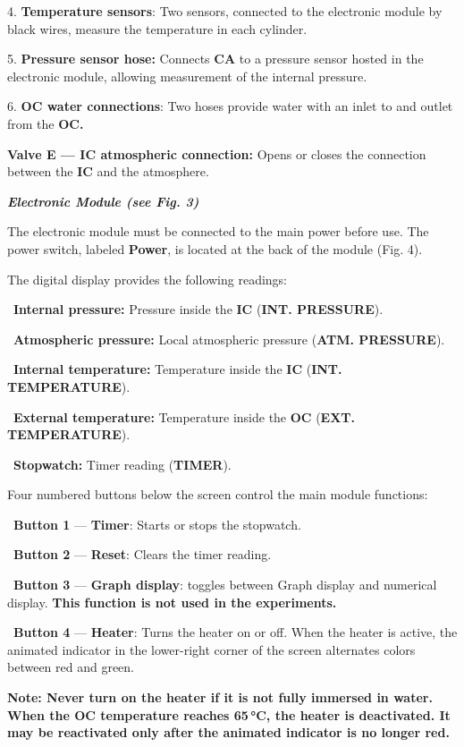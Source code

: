 4. \textbf{Temperature sensors}: Two sensors, connected to the electronic
module by black wires, measure the temperature in each cylinder.

5. \textbf{Pressure sensor hose:} Connects \textbf{CA} to a pressure sensor
hosted in the electronic module, allowing measurement of the internal
pressure.

6. \textbf{OC water connections}: Two hoses provide water with an inlet to and
outlet from the \textbf{OC.}

\textbf{Valve E — IC atmospheric connection:} Opens or closes the connection
between the \textbf{IC} and the atmosphere.

\textbf{\textit{Electronic Module (see Fig. 3)}}

The electronic module must be connected to the main power before use. The
power switch, labeled \textbf{Power}, is located at the back of the module
(Fig. 4).

The digital display provides the following readings:

\textbullet\ \textbf{Internal pressure:} Pressure inside the \textbf{IC}
(\textbf{INT. PRESSURE}).

\textbullet\ \textbf{Atmospheric pressure:} Local atmospheric pressure
(\textbf{ATM. PRESSURE}).

\textbullet\ \textbf{Internal temperature:} Temperature inside the \textbf{IC}
(\textbf{INT. TEMPERATURE}).

\textbullet\ \textbf{External temperature:} Temperature inside the \textbf{OC}
(\textbf{EXT. TEMPERATURE}).

\textbullet\ \textbf{Stopwatch:} Timer reading (\textbf{TIMER}).

Four numbered buttons below the screen control the main module functions:

\textbullet\ \textbf{Button 1} — \textbf{Timer}: Starts or stops the
stopwatch.

\textbullet\ \textbf{Button 2} — \textbf{Reset}: Clears the timer reading.

\textbullet\ \textbf{Button 3} — \textbf{Graph display}: toggles between Graph
display and numerical display. \textbf{This function is not used in the
experiments.}

\textbullet\ \textbf{Button 4} — \textbf{Heater}: Turns the heater on or off.
When the heater is active, the animated indicator in the lower-right corner of
the screen alternates colors between red and green.

\textbf{Note: Never turn on the heater if it is not fully immersed in water.
When the OC temperature reaches 65\,°C, the heater is deactivated. It may be
reactivated only after the animated indicator is no longer red.}

